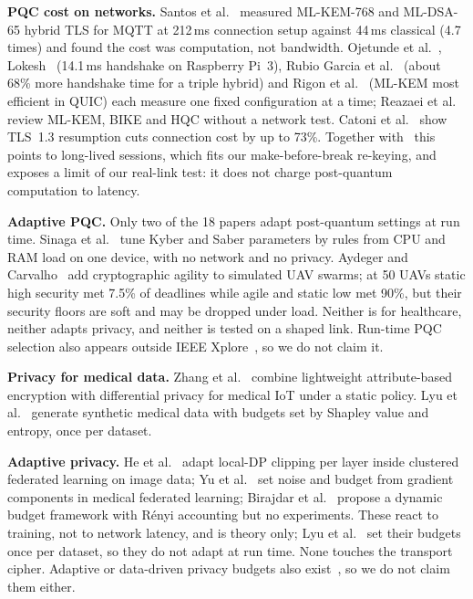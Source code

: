 \documentclass[10pt,twocolumn]{article}
\begin{document}
\textbf{PQC cost on networks.} Santos et al.~\cite{ieee07_santos2026} measured ML-KEM-768 and ML-DSA-65 hybrid TLS for MQTT at 212\,ms connection setup against 44\,ms classical (4.7 times) and found the cost was computation, not bandwidth. Ojetunde et al.~\cite{ieee11_ojetunde2025}, Lokesh~\cite{ieee12_lokesh2025} (14.1\,ms handshake on Raspberry Pi~3), Rubio Garcia et al.~\cite{ieee13_rubiogarcia2023} (about 68\% more handshake time for a triple hybrid) and Rigon et al.~\cite{ieee15_rigon2025} (ML-KEM most efficient in QUIC) each measure one fixed configuration at a time; Reazaei et al.~\cite{ieee16_reazaei2026} review ML-KEM, BIKE and HQC without a network test. Catoni et al.~\cite{ieee14_catoni2025} show TLS~1.3 resumption cuts connection cost by up to 73\%. Together with~\cite{ieee07_santos2026} this points to long-lived sessions, which fits our make-before-break re-keying, and exposes a limit of our real-link test: it does not charge post-quantum computation to latency.

\textbf{Adaptive PQC.} Only two of the 18 papers adapt post-quantum settings at run time. Sinaga et al.~\cite{ieee06_sinaga2025} tune Kyber and Saber parameters by rules from CPU and RAM load on one device, with no network and no privacy. Aydeger and Carvalho~\cite{ieee10_aydeger2026} add cryptographic agility to simulated UAV swarms; at 50 UAVs static high security met 7.5\% of deadlines while agile and static low met 90\%, but their security floors are soft and may be dropped under load. Neither is for healthcare, neither adapts privacy, and neither is tested on a shaped link. Run-time PQC selection also appears outside IEEE Xplore~\cite{qpradax,adaptiveqke,caap}, so we do not claim it.

\textbf{Privacy for medical data.} Zhang et al.~\cite{ieee19_zhang2023} combine lightweight attribute-based encryption with differential privacy for medical IoT under a static policy. Lyu et al.~\cite{ieee20_lyu2025} generate synthetic medical data with budgets set by Shapley value and entropy, once per dataset.

\textbf{Adaptive privacy.} He et al.~\cite{ieee17_he2024} adapt local-DP clipping per layer inside clustered federated learning on image data; Yu et al.~\cite{ieee18_yu2024} set noise and budget from gradient components in medical federated learning; Birajdar et al.~\cite{ieee21_birajdar2025} propose a dynamic budget framework with R\'enyi accounting but no experiments. These react to training, not to network latency, and \cite{ieee21_birajdar2025} is theory only; Lyu et al.~\cite{ieee20_lyu2025} set their budgets once per dataset, so they do not adapt at run time. None touches the transport cipher. Adaptive or data-driven privacy budgets also exist~\cite{ieee18_yu2024,ieee20_lyu2025,ieee21_birajdar2025,alpine}, so we do not claim them either.
\end{document}
